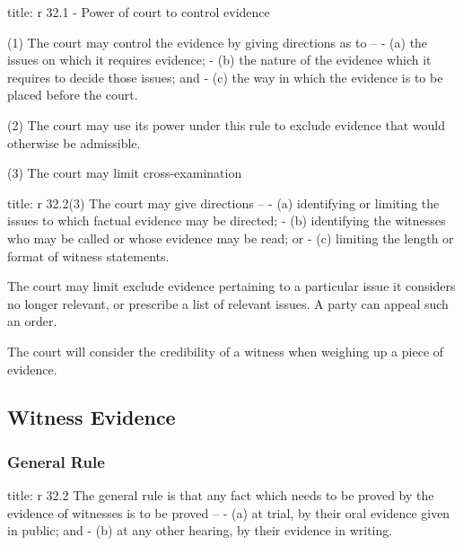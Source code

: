 \documentclass[
]{article}
\newenvironment{Shaded}{}{}
\newcommand{\NormalTok}[1]{#1}
\begin{document}
\begin{Shaded}
\begin{Highlighting}[]
\NormalTok{title: r 32.1 {-} Power of court to control evidence}

\NormalTok{(1) The court may control the evidence by giving directions as to –}
\NormalTok{{-} (a) the issues on which it requires evidence;}
\NormalTok{{-} (b) the nature of the evidence which it requires to decide those issues; and}
\NormalTok{{-} (c) the way in which the evidence is to be placed before the court.}

\NormalTok{(2) The court may use its power under this rule to exclude evidence that would otherwise be admissible.}

\NormalTok{(3) The court may limit cross{-}examination}
\end{Highlighting}
\end{Shaded}

\begin{Shaded}
\begin{Highlighting}[]
\NormalTok{title: r 32.2(3)}
\NormalTok{The court may give directions –}
\NormalTok{{-} (a) identifying or limiting the issues to which factual evidence may be directed;}
\NormalTok{{-} (b) identifying the witnesses who may be called or whose evidence may be read; or}
\NormalTok{{-} (c) limiting the length or format of witness statements.}
\end{Highlighting}
\end{Shaded}

The court may limit exclude evidence pertaining to a particular issue it
considers no longer relevant, or prescribe a list of relevant issues. A
party can appeal such an order.

The court will consider the credibility of a witness when weighing up a
piece of evidence.

\hypertarget{witness-evidence}{%
\subsection{Witness Evidence}\label{witness-evidence}}

\hypertarget{general-rule}{%
\subsubsection{General Rule}\label{general-rule}}

\begin{Shaded}
\begin{Highlighting}[]
\NormalTok{title: r 32.2}
\NormalTok{The general rule is that any fact which needs to be proved by the evidence of witnesses is to be proved –}
\NormalTok{{-} (a) at trial, by their oral evidence given in public; and}
\NormalTok{{-} (b) at any other hearing, by their evidence in writing.}
\end{Highlighting}
\end{Shaded}
\end{document}
